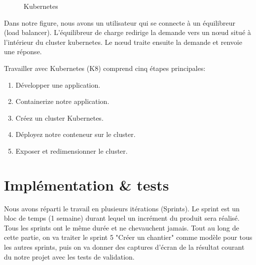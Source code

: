 \begin{itemize}
\begin{figure}[H]
	\caption{\label{fig:my-label} Kubernetes}
\end{figure}

Dans notre figure, nous avons un utilisateur qui se connecte \`a un \'equilibreur (load balancer). L'\'equilibreur de charge redirige la demande vers un n\oe{}ud situ\'e \`a l'int\'erieur du cluster kubernetes. Le n\oe{}ud traite ensuite la demande et renvoie une r\'eponse.

Travailler avec Kubernetes (K8) comprend cinq \'etapes principales:
\begin{enumerate}
\item D\'evelopper une application.
\item Containerize notre application.
\item Cr\'eez un cluster Kubernetes.
\item D\'eployez notre conteneur sur le cluster.
\item Exposer et redimensionner le cluster.
\end{enumerate}

\end{itemize}

\section{Impl\'ementation \& tests}

Nous avons r\'eparti le travail en plusieurs it\'erations (Sprints). Le sprint est un bloc de temps (1 semaine) durant lequel un incr\'ement du produit sera r\'ealis\'e. Tous les sprints ont le m\^eme dur\'ee et ne chevauchent jamais. Tout au long de cette partie, on va traiter le sprint 5 "Cr\'eer un chantier" comme mod\`ele pour tous les autres sprints, puis on va donner des captures d'\'ecran de la r\'esultat courant du notre projet avec les tests de validation.

